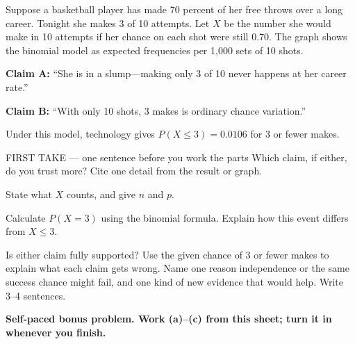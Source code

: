 \documentclass[14pt]{extarticle}
\begin{document}
\pagestyle{empty}


\noindent\begin{minipage}[t]{0.57\linewidth}
\vspace{0pt}
Suppose a basketball player has made 70 percent of her free throws over a long career. Tonight she makes 3 of 10 attempts. Let $X$ be the number she would make in 10 attempts if her chance on each shot were still 0.70. The graph shows the binomial model as expected frequencies per 1,000 sets of 10 shots.\par\smallskip \textbf{Claim A:} ``She is in a slump---making only 3 of 10 never happens at her career rate.''\par \textbf{Claim B:} ``With only 10 shots, 3 makes is ordinary chance variation.''\par Under this model, technology gives $P(X\leq3)=0.0106$ for 3 or fewer makes.\par
\end{minipage}\hfill
\begin{minipage}[t]{0.40\linewidth}
\vspace{0pt}
\begin{center}
\end{center}
\end{minipage}

\begin{firsttakebox}{FIRST TAKE --- one sentence before you work the parts}
Which claim, if either, do you trust more? Cite one detail from the result or graph.
\end{firsttakebox}

\begin{description}[leftmargin=1.15in, labelwidth=1in, itemsep=2pt, topsep=2pt]
  \item[\dokbadge{1}~(a)] State what $X$ counts, and give $n$ and $p$.
  \item[\dokbadge{2}~(b)] Calculate $P(X=3)$ using the binomial formula. Explain how this event differs from $X\leq3$.
  \item[\dokbadge{3}~(c)] Is either claim fully supported? Use the given chance of 3 or fewer makes to explain what each claim gets wrong. Name one reason independence or the same success chance might fail, and one kind of new evidence that would help. Write 3--4 sentences.
\end{description}

\vfill
\textbf{Self-paced bonus problem. Work (a)--(c) from this sheet; turn it in whenever you finish.}
\end{document}
